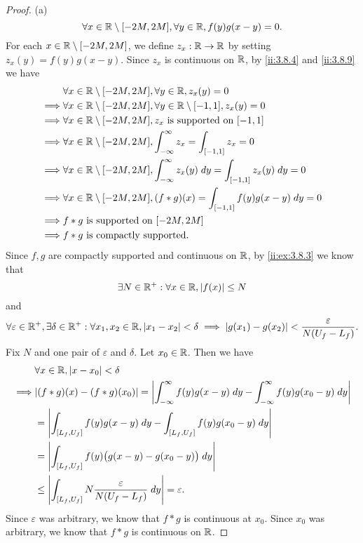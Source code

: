 \begin{proof}{(a)}
  \[
    \forall x \in \mathbb{R} \setminus [-2M, 2M], \forall y \in \mathbb{R}, f(y) g(x - y) = 0.
  \]
  For each \(x \in \mathbb{R} \setminus [-2M, 2M]\), we define \(z_x : \mathbb{R} \to \mathbb{R}\) by setting \(z_x(y) = f(y) g(x - y)\).
  Since \(z_x\) is continuous on \(\mathbb{R}\), by \cref{ii:3.8.4} and \cref{ii:3.8.9} we have
  \begin{align*}
             & \forall x \in \mathbb{R} \setminus [-2M, 2M], \forall y \in \mathbb{R}, z_x(y) = 0                                         \\
    \implies & \forall x \in \mathbb{R} \setminus [-2M, 2M], \forall y \in \mathbb{R} \setminus [-1, 1], z_x(y) = 0                       \\
    \implies & \forall x \in \mathbb{R} \setminus [-2M, 2M], z_x \text{ is supported on } [-1, 1]                                 \\
    \implies & \forall x \in \mathbb{R} \setminus [-2M, 2M], \int_{-\infty}^\infty z_x = \int_{[-1, 1]} z_x = 0                   \\
    \implies & \forall x \in \mathbb{R} \setminus [-2M, 2M], \int_{-\infty}^\infty z_x(y) \; dy = \int_{[-1, 1]} z_x(y) \; dy = 0 \\
    \implies & \forall x \in \mathbb{R} \setminus [-2M, 2M], (f * g)(x) = \int_{[-1, 1]} f(y) g(x - y) \; dy = 0                  \\
    \implies & f * g \text{ is supported on } [-2M, 2M]                                                                   \\
    \implies & f * g \text{ is compactly supported}.
  \end{align*}
  Since \(f, g\) are compactly supported and continuous on \(\mathbb{R}\), by \cref{ii:ex:3.8.3} we know that
  \[
    \exists N \in \mathbb{R}^+ : \forall x \in \mathbb{R}, \left\lvert f(x)\right\rvert \leq N
  \]
  and
  \[
    \forall \varepsilon \in \mathbb{R}^+, \exists \delta \in \mathbb{R}^+ : \forall x_1, x_2 \in \mathbb{R}, \left\lvert x_1 - x_2\right\rvert < \delta \implies \left\lvert g(x_1) - g(x_2)\right\rvert < \dfrac{\varepsilon}{N (U_f - L_f)}.
  \]
  Fix \(N\) and one pair of \(\varepsilon\) and \(\delta\).
  Let \(x_0 \in \mathbb{R}\).
  Then we have
  \begin{align*}
             & \forall x \in \R, \abs{x - x_0} < \delta                                                                                        \\
    \implies & \abs{(f * g)(x) - (f * g)(x_0)} = \abs{\int_{-\infty}^\infty f(y) g(x - y) \; dy - \int_{-\infty}^\infty f(y) g(x_0 - y) \; dy} \\
             & = \abs{\int_{[L_f, U_f]} f(y) g(x - y) \; dy - \int_{[L_f, U_f]} f(y) g(x_0 - y) \; dy}                                         \\
             & = \abs{\int_{[L_f, U_f]} f(y) \big(g(x - y) - g(x_0 - y)\big) \; dy}                                                            \\
             & \leq \abs{\int_{[L_f, U_f]} N \dfrac{\varepsilon}{N (U_f - L_f)} \; dy} = \varepsilon.
  \end{align*}
  Since \(\varepsilon\) was arbitrary, we know that \(f * g\) is continuous at \(x_0\).
  Since \(x_0\) was arbitrary, we know that \(f * g\) is continuous on \(\mathbb{R}\).
\end{proof}

